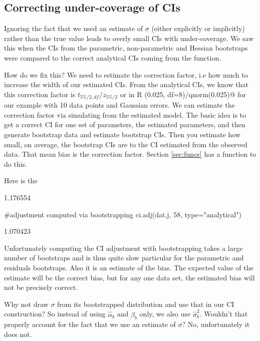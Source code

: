 \subsection{Correcting under-coverage of CIs}

Ignoring the fact that we used an estimate of $\sigma$ (either explicitly or implicitly) rather than the true value leads to overly small CIs with under-coverage.  We saw this when the CIs from the parametric, non-parametric and Hessian bootstraps were compared to the correct analytical CIs coming from the \verb@predict@ function.  

How do we fix this? We need to estimate the correction factor, i.e how much to increase the width of our estimated CIs.  From the analytical CIs, we know that this correction factor is $t_{5\%/2, df}/z_{5\%/2}$ or in R \verb@qt(0.025, df=8)/qnorm(0.025)@ for our example with 10 data points and Gaussian errors.  We can estimate the correction factor via simulating from the estimated model.  The basic idea is to get a correct CI for one set of parameters, the estimated parameters, and then generate bootstrap data and estimate bootstrap CIs.  Then you estimate how small, on average, the bootstrap CIs are to the CI estimated from the observed data.  That mean bias is the correction factor.  Section \ref{sec:funcs} has a function to do this.


Here is the 
\begin{Schunk}
\begin{Soutput}
[1] 1.176554
\end{Soutput}
\begin{Sinput}
 #adjustment computed via bootstrapping
 ci.adj(dat.j, 58, type="analytical")
\end{Sinput}
\begin{Soutput}
[1] 1.070423
\end{Soutput}
\end{Schunk}
Unfortunately computing the CI adjustment with bootstrapping takes a large number of bootstraps and is thus quite slow particular for the parametric and residuals bootstraps. Also it is an estimate of the bias.  The expected value of the estimate will be the correct bias, but for any one data set, the estimated bias will not be precisely correct.

Why not draw $\sigma$ from its bootstrapped distribution and use that in our CI construction? So instead of using $\hat{\alpha}_b$ and $\hat{\beta}_b$ only, we also use $\hat{\sigma}^2_b$. Wouldn't that properly account for the fact that we use an estimate of $\sigma$?  No, unfortunately it does not. 


